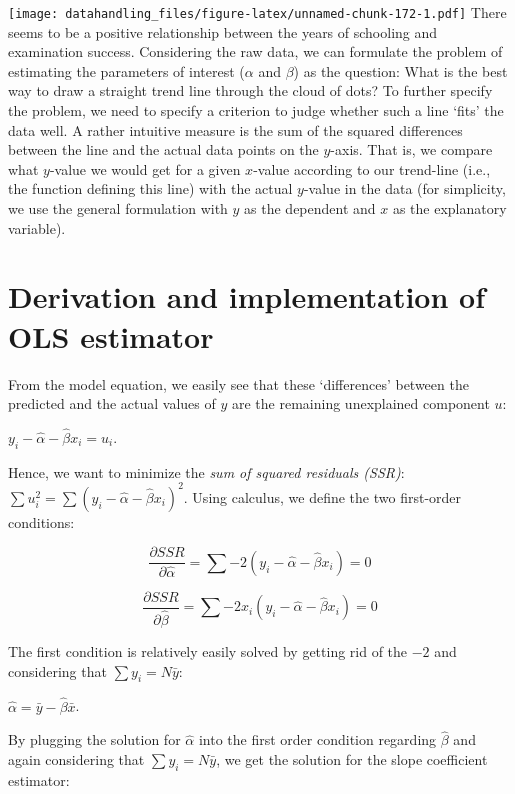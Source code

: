 \documentclass[
  12pt,
]{style/krantz}
\begin{document}
\texttt{[image: datahandling\_files/figure-latex/unnamed-chunk-172-1.pdf]}
There seems to be a positive relationship between the years of schooling and examination success. Considering the raw data, we can formulate the problem of estimating the parameters of interest (\(\alpha\) and \(\beta\)) as the question: What is the best way to draw a straight trend line through the cloud of dots? To further specify the problem, we need to specify a criterion to judge whether such a line `fits' the data well. A rather intuitive measure is the sum of the squared differences between the line and the actual data points on the \(y\)-axis. That is, we compare what \(y\)-value we would get for a given \(x\)-value according to our trend-line (i.e., the function defining this line) with the actual \(y\)-value in the data (for simplicity, we use the general formulation with \(y\) as the dependent and \(x\) as the explanatory variable).

\hypertarget{derivation-and-implementation-of-ols-estimator}{%
\section{Derivation and implementation of OLS estimator}\label{derivation-and-implementation-of-ols-estimator}}

From the model equation, we easily see that these `differences' between the predicted and the actual values of \(y\) are the remaining unexplained component \(u\):

\(y_{i}-\hat{\alpha}-\hat{\beta} x_i=u_i\).

Hence, we want to minimize the \emph{sum of squared residuals (SSR)}: \(\sum{u_i^2}=\sum{(y_{i}-\hat{\alpha}-\hat{\beta} x_i)^2}\). Using calculus, we define the two first-order conditions:

\[\frac{\partial SSR}{\partial \hat{\alpha}}=\sum{-2(y_{i}-\hat{\alpha}-\hat{\beta} x_i)}=0\]

\[\frac{\partial SSR}{\partial \hat{\beta}}=\sum{-2x_i(y_{i}-\hat{\alpha}-\hat{\beta} x_i)}=0\]

The first condition is relatively easily solved by getting rid of the \(-2\) and considering that \(\sum{y_i}=N\bar{y}\):

\(\hat{\alpha}=\bar{y}-\hat{\beta}\bar{x}\).

By plugging the solution for \(\hat{\alpha}\) into the first order condition regarding \(\hat{\beta}\) and again considering that \(\sum{y_i}=N\bar{y}\), we get the solution for the slope coefficient estimator:
\end{document}
